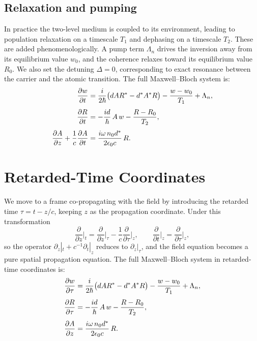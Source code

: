 \documentclass[12pt,a4paper]{article}
\begin{document}
\subsection{Relaxation and pumping}

In practice the two-level medium is coupled to its environment, leading to
population relaxation on a timescale $T_1$ and dephasing on a timescale $T_2$.
These are added phenomenologically. A pump term $\Lambda_n$ drives the
inversion away from its equilibrium value $w_0$, and the coherence relaxes
toward its equilibrium value $R_0$. We also set the detuning $\Delta = 0$,
corresponding to exact resonance between the carrier and the atomic transition.
The full Maxwell--Bloch system is:
\begin{align}
  \dfrac{\partial w}{\partial t}
    &= \frac{i}{2\hbar}\bigl(dAR^* - d^*A^*R\bigr)
       - \frac{w - w_0}{T_1}
       + \Lambda_n,
  \label{eq:invSVEA}\\[4pt]
  \dfrac{\partial R}{\partial t}
    &= - \frac{id}{\hbar}\,A\,w - \frac{R - R_0}{T_2},
  \label{eq:cohSVEA}\\[4pt]
  \dfrac{\partial A}{\partial z} + \frac{1}{c}\dfrac{\partial A}{\partial t}
    &= \frac{i\omega\,n_0 d^*}{2\epsilon_0 c}\,R.
  \label{eq:fieldSVEA}
\end{align}

\section{Retarded-Time Coordinates}

We move to a frame co-propagating with the field by introducing the retarded
time $\tau = t - z/c$, keeping $z$ as the propagation coordinate.
Under this transformation
\begin{equation}
  \frac{\partial}{\partial z}\bigg|_t
  = \frac{\partial}{\partial z}\bigg|_\tau
  - \frac{1}{c}\frac{\partial}{\partial \tau}\bigg|_z,
  \qquad
  \frac{\partial}{\partial t}\bigg|_z
  = \frac{\partial}{\partial \tau}\bigg|_z,
\end{equation}
so the operator $\partial_z|_t + c^{-1}\partial_t|_z$ reduces to
$\partial_z|_\tau$, and the field equation becomes a pure spatial
propagation equation. The full Maxwell--Bloch system in retarded-time
coordinates is:
\begin{align}
  \dfrac{\partial w}{\partial \tau}
    &= \frac{i}{2\hbar}\bigl(dAR^* - d^*A^*R\bigr)
       - \frac{w - w_0}{T_1}
       + \Lambda_n,
  \label{eq:invRet}\\[4pt]
  \dfrac{\partial R}{\partial \tau}
    &= - \frac{id}{\hbar}\,A\,w - \frac{R-R_0}{T_2},
  \label{eq:cohRet}\\[4pt]
  \dfrac{\partial A}{\partial z}
    &= \frac{i\omega\,n_0 d^*}{2\epsilon_0 c}\,R.
  \label{eq:fieldRet}
\end{align}
\end{document}
